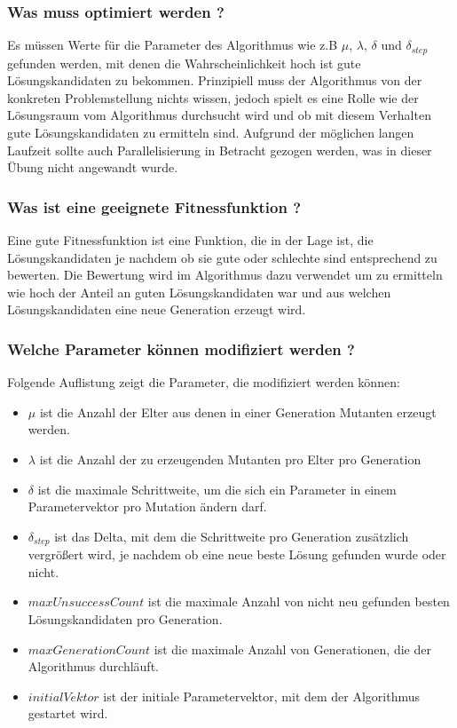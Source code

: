 \subsubsection{Was muss optimiert werden ?}
Es müssen Werte für die Parameter des Algorithmus wie z.B $\mu$, $\lambda$, $\delta$ und $\delta_{step}$ gefunden werden, mit denen die Wahrscheinlichkeit hoch ist gute Lösungskandidaten zu bekommen. Prinzipiell muss der Algorithmus von der konkreten Problemstellung nichts wissen, jedoch spielt es eine Rolle wie der Lösungsraum vom Algorithmus durchsucht wird und ob mit diesem Verhalten gute Lösungskandidaten zu ermitteln sind.
\newline
\newline
Aufgrund der möglichen langen Laufzeit sollte auch Parallelisierung in Betracht gezogen werden, was in dieser Übung nicht angewandt wurde.

\subsubsection{Was ist eine geeignete Fitnessfunktion ?}
Eine gute Fitnessfunktion ist eine Funktion, die in der Lage ist, die Lösungskandidaten je nachdem ob sie gute oder schlechte sind entsprechend zu bewerten. Die Bewertung wird im Algorithmus dazu verwendet um zu ermitteln wie hoch der Anteil an guten Lösungskandidaten war und aus welchen Lösungskandidaten eine neue Generation erzeugt wird.

\subsubsection{Welche Parameter können modifiziert werden ?}
Folgende Auflistung zeigt die Parameter, die modifiziert werden können:
\begin{itemize}
	\item $\mu$ ist die Anzahl der Elter aus denen in einer Generation Mutanten erzeugt werden.
	\item $\lambda$ ist die Anzahl der zu erzeugenden Mutanten pro Elter pro Generation
	\item $\delta$ ist die maximale Schrittweite, um die sich ein Parameter in einem Parametervektor pro Mutation ändern darf.
	\item $\delta_{step}$ ist das Delta, mit dem die Schrittweite pro Generation zusätzlich vergrößert wird, je nachdem ob eine neue beste Lösung gefunden wurde oder nicht.
	\item $maxUnsuccessCount$ ist die maximale Anzahl von nicht neu gefunden besten Lösungskandidaten pro Generation.
	\item $maxGenerationCount$ ist die maximale Anzahl von Generationen, die der Algorithmus durchläuft.
	\item $initialVektor$ ist der initiale Parametervektor, mit dem der Algorithmus gestartet wird.	
\end{itemize}

